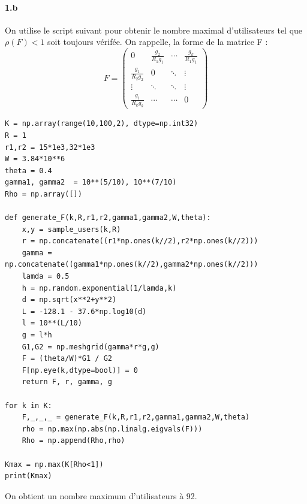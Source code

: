 \documentclass[a4paper,11pt,2]{article}
\begin{document}
\paragraph{1.b} On utilise le script suivant pour obtenir le nombre maximal d'utilisateurs tel que $\rho(F)<1$ soit toujours vérifée. On rappelle, la forme de la matrice F :
$$ 
F = \begin{pmatrix} 
        0 & \frac{g_2}{R_1g_1} & \cdots & \frac{g_k}{R_1g_1} \\
        \frac{g_1}{R_2g_2} & 0 & \ddots & \vdots \\
        \vdots & \ddots & \ddots & \vdots \\
        \frac{g_1}{R_kg_k} & \cdots & \cdots & 0
    \end{pmatrix}       
$$

\begin{center}
\begin{lstlisting}
K = np.array(range(10,100,2), dtype=np.int32)
R = 1
r1,r2 = 15*1e3,32*1e3
W = 3.84*10**6
theta = 0.4
gamma1, gamma2  = 10**(5/10), 10**(7/10)
Rho = np.array([])

def generate_F(k,R,r1,r2,gamma1,gamma2,W,theta):
    x,y = sample_users(k,R)
    r = np.concatenate((r1*np.ones(k//2),r2*np.ones(k//2)))
    gamma = np.concatenate((gamma1*np.ones(k//2),gamma2*np.ones(k//2)))
    lamda = 0.5
    h = np.random.exponential(1/lamda,k)
    d = np.sqrt(x**2+y**2)
    L = -128.1 - 37.6*np.log10(d)
    l = 10**(L/10)
    g = l*h
    G1,G2 = np.meshgrid(gamma*r*g,g)
    F = (theta/W)*G1 / G2
    F[np.eye(k,dtype=bool)] = 0
    return F, r, gamma, g

for k in K:
    F,_,_,_ = generate_F(k,R,r1,r2,gamma1,gamma2,W,theta)
    rho = np.max(np.abs(np.linalg.eigvals(F)))
    Rho = np.append(Rho,rho)

Kmax = np.max(K[Rho<1])
print(Kmax)
\end{lstlisting}
\end{center}

On obtient un nombre maximum d'utilisateurs à 92.
\end{document}
